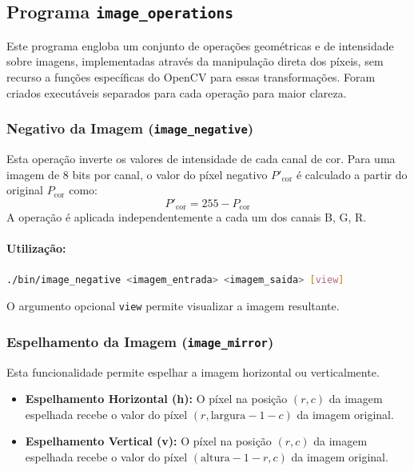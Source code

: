 \documentclass[a4paper, 11pt, portuguese]{article}
\begin{document}
\subsection{Programa \texttt{image\_operations}}

Este programa engloba um conjunto de operações geométricas e de intensidade sobre imagens, implementadas através da manipulação direta dos píxeis, sem recurso a funções específicas do OpenCV para essas transformações. Foram criados executáveis separados para cada operação para maior clareza.

\subsubsection{Negativo da Imagem (\texttt{image\_negative})}
Esta operação inverte os valores de intensidade de cada canal de cor. Para uma imagem de 8 bits por canal, o valor do píxel negativo $P'_{\text{cor}}$ é calculado a partir do original $P_{\text{cor}}$ como:
$$ P'_{\text{cor}} = 255 - P_{\text{cor}} $$
A operação é aplicada independentemente a cada um dos canais B, G, R.

\paragraph{Utilização:}
\begin{lstlisting}[language=bash, caption=Sintaxe de Uso do image\_negative]
./bin/image_negative <imagem_entrada> <imagem_saida> [view]
\end{lstlisting}
O argumento opcional \texttt{view} permite visualizar a imagem resultante.


\subsubsection{Espelhamento da Imagem (\texttt{image\_mirror})}
Esta funcionalidade permite espelhar a imagem horizontal ou verticalmente.
\begin{itemize}
    \item \textbf{Espelhamento Horizontal (h):} O píxel na posição $(r, c)$ da imagem espelhada recebe o valor do píxel $(r, \text{largura} - 1 - c)$ da imagem original.
    \item \textbf{Espelhamento Vertical (v):} O píxel na posição $(r, c)$ da imagem espelhada recebe o valor do píxel $(\text{altura} - 1 - r, c)$ da imagem original.
\end{itemize}
\end{document}
